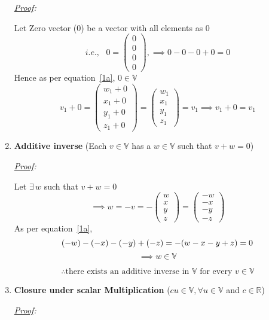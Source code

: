 \documentclass[12pt, letterpaper]{article}
\begin{document}
\begin{enumerate}
\textit{\underline{Proof}:}

  Let Zero vector ($0$) be a vector with all elements as $0$
  \[
   i.e., \,\,\,\, 0 = \begin{pmatrix}0\\0\\0\\0\end{pmatrix},
   \implies  0 - 0 - 0 + 0 = 0
  \]
  Hence as per equation~\ref{1a}, $\boxed{0 \in \mathbb{V}}$
  \[
    v_1 + 0
    = \begin{pmatrix} w_1 + 0\\ x_1 + 0\\ y_1 + 0\\ z_1 + 0 \end{pmatrix}
    = \begin{pmatrix} w_1\\ x_1\\ y_1\\ z_1 \end{pmatrix}
    = v_1
    \implies \boxed{v_1 + 0 = v_1}
  \]

\item \textbf{Additive inverse}
  (Each $v \in \mathbb{V}$ has a $w \in \mathbb{V}$ such that $v + w = 0$)

\textit{\underline{Proof}:}

  Let $\exists \, w$ such that $v + w = 0$
  \[
    \implies w = -v = -\begin{pmatrix}w\\x\\y\\z\end{pmatrix}
    = \begin{pmatrix}-w\\-x\\-y\\-z\end{pmatrix}
  \]
  As per equation~\ref{1a},
  \[(-w) - (-x) - (-y) + (-z) = -(w -x -y +z) = 0\\ \]
  \[\implies w \in \mathbb{V} \]

  \[ \boxed{\therefore \text{there exists an additive inverse in $\mathbb{V}$ for every }v \in \mathbb{V}} \]

\item \textbf{Closure under scalar Multiplication}
  ($cu \in \mathbb{V}, \forall u \in \mathbb{V}$ and $c \in \mathbb{R}$)

\textit{\underline{Proof}:}


\end{enumerate}
\end{document}
